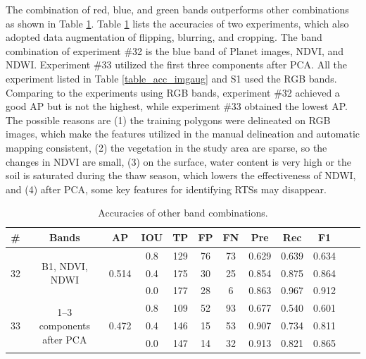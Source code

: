 \documentclass[preprint,12pt,authoryear]{elsarticle}
\begin{document}
The combination of red, blue, and green bands outperforms other combinations as shown in Table \ref{table_acc_otherbands}. Table \ref{table_acc_otherbands} lists the accuracies of two experiments, which also adopted data augmentation of flipping, blurring, and cropping. The band combination of experiment \#32 is the blue band of Planet images, NDVI, and NDWI. Experiment \#33 utilized the first three components after PCA. All the experiment listed in Table \ref{table_acc_imgaug} and S1 used the RGB bands. Comparing to the experiments using RGB bands, experiment \#32 achieved a good AP but is not the highest, while experiment \#33 obtained the lowest AP. The possible reasons are (1) the training polygons were delineated on RGB images, which make the features utilized in the manual delineation and automatic mapping consistent, (2) the vegetation in the study area are sparse, so the changes in NDVI are small, (3) on the surface, water content is very high or the soil is saturated during the thaw season, which lowers the effectiveness of NDWI, and (4) after PCA, some key features for identifying RTSs may disappear. 

\begin{table}[ht]
\footnotesize
\caption{Accuracies of other band combinations.}
\label{table_acc_otherbands}
\begin{tabular}{c c c c  c ccc c c c c}
\toprule
\textbf{\#}&\textbf{Bands}&\textbf{AP}&\textbf{IOU}&\textbf{TP}&\textbf{FP}&\textbf{FN}&\textbf{Pre}&\textbf{Rec}&\textbf{F1}\\
\midrule

\multirow{3}{*}{32} &  \multirow{3}{*}{B1, NDVI, NDWI} & \multirow{3}{*}{0.514}  &0.8&129&76&73&0.629 &0.639 &0.634   \\
 &  &  &0.4&175&30&25&0.854 &0.875 &0.864  \\
 &  &  &0.0&177&28&6&0.863 &0.967 &0.912   \\

\multirow{3}{*}{33} &  \multirow{3}{3cm}{1--3 components after PCA} & \multirow{3}{*}{0.472} &0.8&109&52&93&0.677 &0.540 &0.601  \\
 &  &  &0.4&146&15&53&0.907 &0.734 &0.811  \\
 &  & &0.0&147&14&32&0.913 &0.821 &0.865  \\

\bottomrule
\end{tabular}

\end{table}
\end{document}
